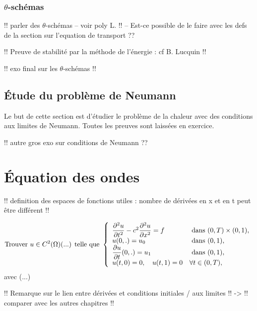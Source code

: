\documentclass[12pt,a4paper,twoside]{article}
\begin{document}
\subsubsection{$\theta$-sch\'emas}

!! parler des $\theta$-sch\'emas -- voir poly L. !! 
-- Est-ce possible de le faire avec les defs de la section sur l'equation de transport ??

!! Preuve de stabilit\'e par la m\'ethode de l'\'energie : cf B. Lucquin !!


!! exo final sur les $\theta$-sch\'emas !!


\subsection{\'Etude du probl\`eme de Neumann}

Le but de cette section est d'\'etudier le probl\`eme de la chaleur
avec des conditions aux limites de Neumann.
Toutes les preuves sont laiss\'ees en exercice.

!! autre gros exo sur conditions de Neumann ??

\section{\'Equation des ondes}

!! definition des espaces de fonctions utiles : nombre de d\'eriv\'ees en x et en t
peut \^etre diff\'erent !!

\begin{equation}
  \label{eq:ondes_Dir}
  \text{Trouver $u \in C^2(\Omega)$(...) telle que  }
  \left\{
    \begin{array}{l l}
      \dfrac{\partial^2 u}{\partial t^2} - c^2 \dfrac{\partial^2 u}{\partial x^2} = f 
      &\text{ dans } (0,T) \times (0,1) ,
      \\
      u(0,.) = u_0 
      & \text{ dans } (0,1) ,
      \\
      \dfrac{\partial u}{\partial t}(0,.) = u_1 
      & \text{ dans } (0,1) ,
      \\
      u(t,0) = 0 , \quad u(t,1) = 0 & \forall t \in (0,T) ,
    \end{array}
  \right.
\end{equation}
avec (...)


!! Remarque sur le lien entre d\'eriv\'ees et conditions initiales / aux limites !!
-> !! comparer avec les autres chapitres !!
\end{document}
